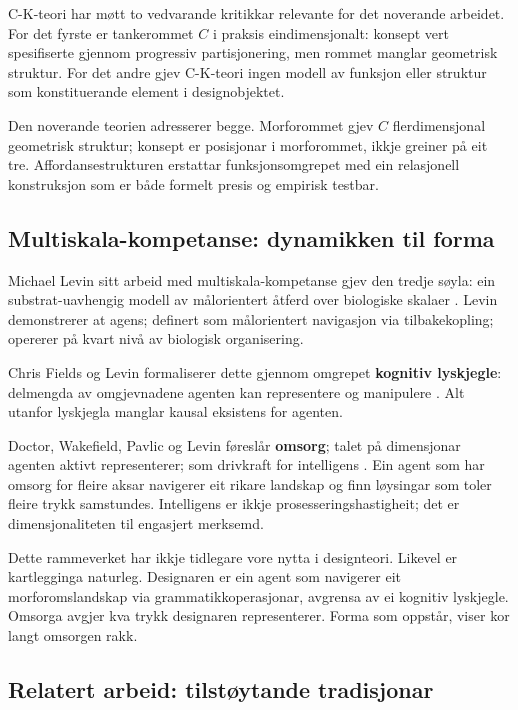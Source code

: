 C-K-teori har møtt to vedvarande kritikkar relevante for det noverande arbeidet. For det fyrste er tankerommet $C$ i praksis eindimensjonalt: konsept vert spesifiserte gjennom progressiv partisjonering, men rommet manglar geometrisk struktur. For det andre gjev C-K-teori ingen modell av funksjon eller struktur som konstituerande element i designobjektet.

Den noverande teorien adresserer begge. Morforommet gjev $C$ flerdimensjonal geometrisk struktur; konsept er posisjonar i morforommet, ikkje greiner på eit tre. Affordansestrukturen erstattar funksjonsomgrepet med ein relasjonell konstruksjon som er både formelt presis og empirisk testbar.

\subsection{Multiskala-kompetanse: dynamikken til forma}

Michael Levin sitt arbeid med multiskala-kompetanse gjev den tredje søyla: ein substrat-uavhengig modell av målorientert åtferd over biologiske skalaer \parencite{Levin2022}. Levin demonstrerer at agens; definert som målorientert navigasjon via tilbakekopling; opererer på kvart nivå av biologisk organisering.

Chris Fields og Levin formaliserer dette gjennom omgrepet \textbf{kognitiv lyskjegle}: delmengda av omgjevnadene agenten kan representere og manipulere \parencite{Fields2022}. Alt utanfor lyskjegla manglar kausal eksistens for agenten.

Doctor, Wakefield, Pavlic og Levin føreslår \textbf{omsorg}; talet på dimensjonar agenten aktivt representerer; som drivkraft for intelligens \parencite{Doctor2024}. Ein agent som har omsorg for fleire aksar navigerer eit rikare landskap og finn løysingar som toler fleire trykk samstundes. Intelligens er ikkje prosesseringshastigheit; det er dimensjonaliteten til engasjert merksemd.

Dette rammeverket har ikkje tidlegare vore nytta i designteori. Likevel er kartlegginga naturleg. Designaren er ein agent som navigerer eit morforomslandskap via grammatikkoperasjonar, avgrensa av ei kognitiv lyskjegle. Omsorga avgjer kva trykk designaren representerer. Forma som oppstår, viser kor langt omsorgen rakk.

\subsection{Relatert arbeid: tilstøytande tradisjonar}

